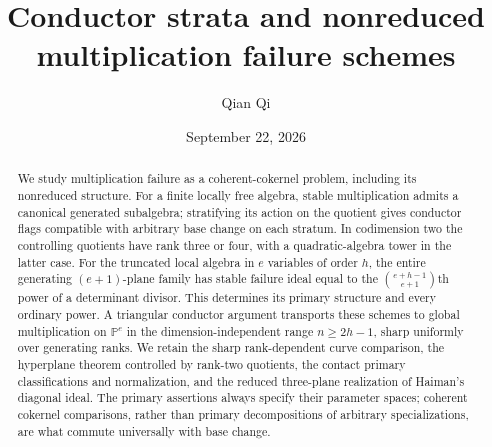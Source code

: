 \documentclass[11pt,reqno]{amsart}
\title[Conductor strata and multiplication failure]{Conductor strata and nonreduced\\multiplication failure schemes}
\author{Qian Qi}
\date{September 22, 2026}
\numberwithin{equation}{section}
\theoremstyle{definition}\newtheorem{definition}[theorem]{Definition}
\theoremstyle{remark}\newtheorem{remark}[theorem]{Remark}
\begin{document}
\begin{abstract}
We study multiplication failure as a coherent-cokernel problem, including its nonreduced structure. For a finite locally free algebra, stable multiplication admits a canonical generated subalgebra; stratifying its action on the quotient gives conductor flags compatible with arbitrary base change on each stratum. In codimension two the controlling quotients have rank three or four, with a quadratic-algebra tower in the latter case. For the truncated local algebra in $e$ variables of order $h$, the entire generating $(e+1)$-plane family has stable failure ideal equal to the $\binom{e+h-1}{e+1}$th power of a determinant divisor. This determines its primary structure and every ordinary power. A triangular conductor argument transports these schemes to global multiplication on $\mathbb P^e$ in the dimension-independent range $n\ge2h-1$, sharp uniformly over generating ranks. We retain the sharp rank-dependent curve comparison, the hyperplane theorem controlled by rank-two quotients, the contact primary classifications and normalization, and the reduced three-plane realization of Haiman's diagonal ideal. The primary assertions always specify their parameter spaces; coherent cokernel comparisons, rather than primary decompositions of arbitrary specializations, are what commute universally with base change.
\end{abstract}
\maketitle













\end{document}
